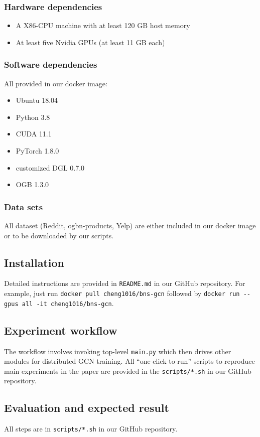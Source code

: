 \documentclass{article}
\begin{document}
\subsubsection{Hardware dependencies}
\begin{itemize}
    \item A X86-CPU machine with at least 120 GB host memory 
    \item At least five Nvidia GPUs (at least 11 GB each)
\end{itemize}

\subsubsection{Software dependencies}
All provided in our docker image:
\begin{itemize}
    \item Ubuntu 18.04
    \item Python 3.8
    \item CUDA 11.1
    \item PyTorch 1.8.0
    \item customized DGL 0.7.0
    \item OGB 1.3.0
\end{itemize}

\subsubsection{Data sets}
All dataset (Reddit, ogbn-products, Yelp) are either included in our docker image or to be downloaded by our scripts.

\subsection{Installation}
Detailed instructions are provided in \texttt{README.md} in our GitHub repository. 
For example, just run \texttt{docker pull cheng1016/bns-gcn} followed by \texttt{docker run -{}-gpus all -it cheng1016/bns-gcn}.

\subsection{Experiment workflow}
The workflow involves invoking top-level \texttt{main.py} which then drives other modules for distributed GCN training.
All ``one-click-to-run'' scripts to reproduce main experiments in the paper are provided in the \texttt{scripts/*.sh} in our GitHub repository.

\subsection{Evaluation and expected result}
All steps are in \texttt{scripts/*.sh} in our GitHub repository.
\end{document}
